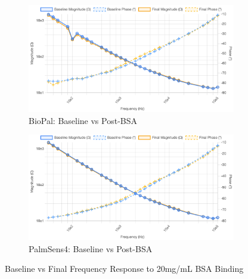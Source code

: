 \begin{figure}[H]
    \centering
    \begin{subfigure}{0.48\textwidth}
        \includegraphics[width=\textwidth]{2g-100mL BioPal.png}
        \caption{BioPal: Baseline vs Post-BSA}
        \label{fig:2g_biopal}
    \end{subfigure}
    \hfill
    \begin{subfigure}{0.48\textwidth}
        \includegraphics[width=\textwidth]{PalmSens2g.png}
        \caption{PalmSens4: Baseline vs Post-BSA}
        \label{fig:2g_palmsens}
    \end{subfigure}
    \caption{Baseline vs Final Frequency Response to 20mg/mL BSA Binding}
    \label{fig:2g_bsa_comparison_final}
\end{figure}

